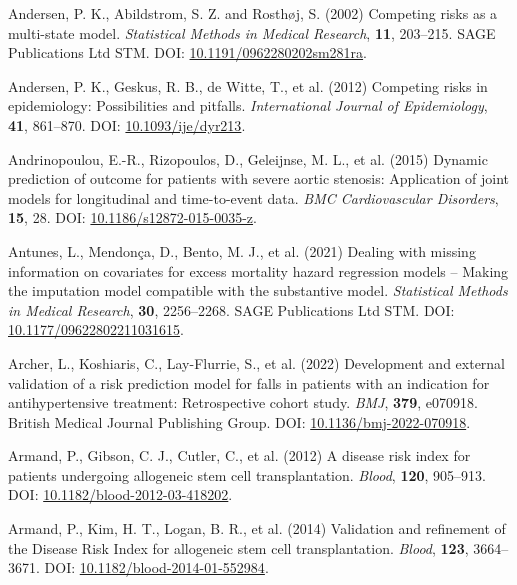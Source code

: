 \documentclass[
  letterpaper,
  paper=240mm:170mm,
  twoside=true,
  open=right,
  fontsize=10pt,
  pagesize=false,
  BCOR=15mm,
  DIV=14,
  headinclude=true,
  footinclude=false,
  headsepline=on]{scrbook}
\newlength{\cslhangindent}
\newenvironment{CSLReferences}[2] %
 {\begin{list}{}{%
  \setlength{\itemindent}{0pt}
  \setlength{\leftmargin}{0pt}
  \setlength{\parsep}{0pt}
  \ifodd #1
   \setlength{\leftmargin}{\cslhangindent}
   \setlength{\itemindent}{-1\cslhangindent}
  \fi
  \setlength{\itemsep}{#2\baselineskip}}}
 {\end{list}}
\begin{document}
\begin{CSLReferences}{1}{1}
Andersen, P. K., Abildstrom, S. Z. and Rosthøj, S. (2002) Competing
risks as a multi-state model. \emph{Statistical Methods in Medical
Research}, \textbf{11}, 203--215. SAGE Publications Ltd STM. DOI:
\href{https://doi.org/10.1191/0962280202sm281ra}{10.1191/0962280202sm281ra}.

Andersen, P. K., Geskus, R. B., de Witte, T., et al. (2012) Competing
risks in epidemiology: Possibilities and pitfalls. \emph{International
Journal of Epidemiology}, \textbf{41}, 861--870. DOI:
\href{https://doi.org/10.1093/ije/dyr213}{10.1093/ije/dyr213}.

Andrinopoulou, E.-R., Rizopoulos, D., Geleijnse, M. L., et al. (2015)
Dynamic prediction of outcome for patients with severe aortic stenosis:
Application of joint models for longitudinal and time-to-event data.
\emph{BMC Cardiovascular Disorders}, \textbf{15}, 28. DOI:
\href{https://doi.org/10.1186/s12872-015-0035-z}{10.1186/s12872-015-0035-z}.

Antunes, L., Mendonça, D., Bento, M. J., et al. (2021) Dealing with
missing information on covariates for excess mortality hazard regression
models -- {Making} the imputation model compatible with the substantive
model. \emph{Statistical Methods in Medical Research}, \textbf{30},
2256--2268. SAGE Publications Ltd STM. DOI:
\href{https://doi.org/10.1177/09622802211031615}{10.1177/09622802211031615}.

Archer, L., Koshiaris, C., Lay-Flurrie, S., et al. (2022) Development
and external validation of a risk prediction model for falls in patients
with an indication for antihypertensive treatment: Retrospective cohort
study. \emph{BMJ}, \textbf{379}, e070918. British Medical Journal
Publishing Group. DOI:
\href{https://doi.org/10.1136/bmj-2022-070918}{10.1136/bmj-2022-070918}.

Armand, P., Gibson, C. J., Cutler, C., et al. (2012) A disease risk
index for patients undergoing allogeneic stem cell transplantation.
\emph{Blood}, \textbf{120}, 905--913. DOI:
\href{https://doi.org/10.1182/blood-2012-03-418202}{10.1182/blood-2012-03-418202}.

Armand, P., Kim, H. T., Logan, B. R., et al. (2014) Validation and
refinement of the {Disease Risk Index} for allogeneic stem cell
transplantation. \emph{Blood}, \textbf{123}, 3664--3671. DOI:
\href{https://doi.org/10.1182/blood-2014-01-552984}{10.1182/blood-2014-01-552984}.


\end{CSLReferences}
\end{document}

